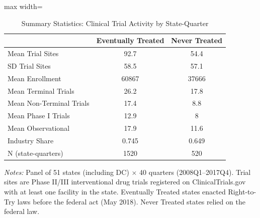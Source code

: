 \begin{table}[htbp]
\centering
\caption{Summary Statistics: Clinical Trial Activity by State-Quarter}
\label{tab:summary}
\begin{adjustbox}{max width=\textwidth}
\begin{tabular}{lcc}
\hline\hline
 & Eventually Treated & Never Treated \\
\hline
Mean Trial Sites  &  92.7  &  54.4  \\
SD Trial Sites  &  58.5  &  57.1  \\
Mean Enrollment  &  60867  &  37666  \\
Mean Terminal Trials  &  26.2  &  17.8  \\
Mean Non-Terminal Trials  &  17.4  &  8.8  \\
Mean Phase I Trials  &  12.9  &  8  \\
Mean Observational  &  17.9  &  11.6  \\
Industry Share  &  0.745  &  0.649  \\
N (state-quarters)  &  1520  &  520  \\
\hline\hline
\end{tabular}
\end{adjustbox}
\begin{minipage}{0.95\textwidth}
\footnotesize \textit{Notes:} Panel of 51 states (including DC) $\times$ 40 quarters (2008Q1--2017Q4). Trial sites are Phase II/III interventional drug trials registered on ClinicalTrials.gov with at least one facility in the state. Eventually Treated states enacted Right-to-Try laws before the federal act (May 2018). Never Treated states relied on the federal law.
\end{minipage}
\end{table}
